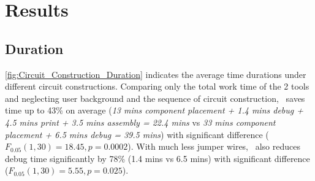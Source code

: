 \section{Results}

\subsection{Duration}


\autoref{fig:Circuit_Construction_Duration} indicates the average time durations under different circuit constructions. Comparing only the total work time of the 2 tools and neglecting user background and the sequence of circuit construction, \papertitle\ saves time up to 43\% on average (\textit{13 mins component placement + 1.4 mins debug + 4.5 mins print + 3.5 mins assembly = 22.4 mins} vs \textit{33 mins component placement + 6.5 mins debug = 39.5 mins}) with significant difference ($F_{0.05} (1, 30) = 18.45, p = 0.0002$). With much less jumper wires, \papertitle\ also reduces debug time significantly by 78\% (1.4 mins vs 6.5 mins) with significant difference  ($F_{0.05} (1, 30) = 5.55, p = 0.025$).


